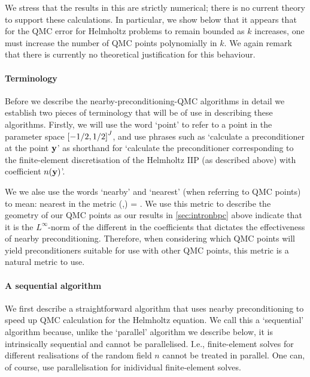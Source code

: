 We stress that the results in this  are strictly numerical; there is no current theory to support these calculations. In particular, we show below that it appears that for the QMC error for Helmholtz problems to remain bounded as $k$ increases, one must increase the number of QMC points polynomially in $k.$ We again remark that there is currently no theoretical justification for this behaviour.

\paragraph{Terminology} Before we describe the nearby-preconditioning-QMC algorithms in detail we establish two pieces of terminology that will be of use in describing these algorithms. Firstly, we will use the word `point' to refer to a point in the parameter space $\cube{J}$, and use phrases such as `calculate a preconditioner at the point $\mathbf{y}$' as shorthand for `calculate the preconditioner corresponding to the finite-element discretisation of the Helmholtz IIP (as described above) with coefficient $n(\mathbf{y})$'.

We we alse use the words `nearby' and `nearest' (when referring to QMC points) to mean: nearest in the metric
\beqs
\dQMC(\byo,\byt) = .
\eeqs
We use this metric to describe the geometry of our QMC points as our results in \cref{sec:intronbpc} above indicate that it is the $L^\infty$-norm of the different in the coefficients that dictates the effectiveness of nearby preconditioning. Therefore, when considering which QMC points will yield preconditioners suitable for use with other QMC points, this metric is a natural metric to use.


\paragraph{A sequential algorithm} We first describe a straightforward algorithm that uses nearby preconditioning to speed up QMC calculation for the Helmholtz equation. We call this a `sequential' algorithm because, unlike the `parallel' algorithm we describe below, it is intrinsically sequential and cannot be parallelised. I.e., finite-element solves for different realisations of the random field $n$ cannot be treated in parallel. One can, of course, use parallelisation for inidividual finite-element solves.

